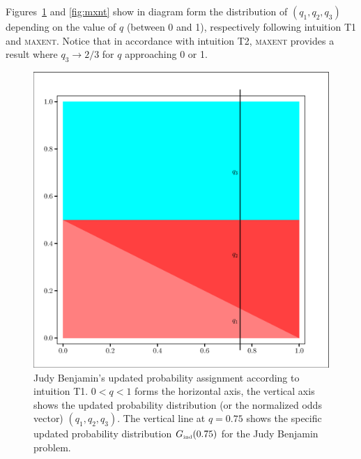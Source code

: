 \documentclass[12pt]{article}
\begin{document}
Figures~\ref{fig:unif} and \ref{fig:mxnt} show in diagram form the
distribution of $(q_{1},q_{2},q_{3})$ depending on the value of $q$
(between 0 and 1), respectively following intuition T1 and
\textsc{maxent}. Notice that in accordance with intuition T2,
\textsc{maxent} provides a result where $q_{3}\rightarrow{}2/3$ for
$q$ approaching 0 or 1.

\begin{figure}[h]
  \begin{flushright}
    \begin{minipage}[h]{\lwv\linewidth}
      \includegraphics[width=\textwidth]{zeroone-unif.eps}
      \caption{Judy Benjamin's updated probability assignment
        according to intuition T1. $0<q<1$ forms the horizontal axis,
        the vertical axis shows the updated probability distribution
        (or the normalized odds vector) $(q_{1},q_{2},q_{3})$. The
        vertical line at $q=0.75$ shows the specific updated
        probability distribution $G_{\mbox{\tiny ind}}(0.75)$ for the Judy
        Benjamin problem.}
      \label{fig:unif}
    \end{minipage}
  \end{flushright}
\end{figure}
\end{document}
